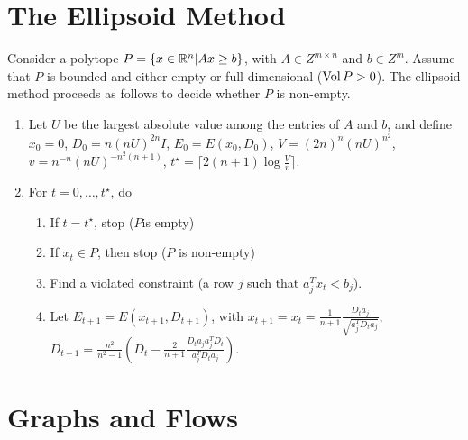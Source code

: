 \section{The Ellipsoid Method}
\label{sec:ellipsoid-method}

\begin{defn}
  \label{sec:ellipsoid-method-1}
  Consider a polytope $P = \{ x \in \mathbb{R}^{n} | Ax \geq b \} $, with $A \in
  Z^{m \times n}$ and $b \in Z^{m}$.  Assume that $P$ is bounded and
  either empty or full-dimensional ($\operatorname*{Vol} P > 0$).  The ellipsoid
  method proceeds as follows to decide whether $P$ is non-empty.

  \begin{enumerate}
  \item Let $U$ be the largest absolute value among the entries of $A$
    and $b$, and define $x_{0} = 0$, $D_{0} = n(nU)^{2n}I$, $E_{0} =
    E(x_{0}, D_{0})$, $V = (2n)^{n}(nU)^{n^{2}}$, $v =
    n^{-n}(nU)^{-n^{2}(n+1)}$, $t^{\star} = \lceil 2(n+1) \log
    \frac{V}{v} \rceil$.
  \item For $t = 0, \dots, t^{\star}$, do
    \begin{enumerate}
    \item If $t = t^{\star}$, stop ($P$is empty)
    \item If $x_{t} \in P$, then stop ($P$ is non-empty)
    \item Find a violated constraint (a row $j$ such that $a_{j}^{T}
      x_{t} < b_{j}$).
    \item Let $E_{t+1} = E(x_{t+1}, D_{t+1})$, with $x_{t+1} = x_{t} =
      \frac{1}{n+1} \frac{D_{t} a_{j}}{\sqrt{a_{j}^{T} D_{t} a_{j}}}$,
      $D_{t+1} = \frac{n^{2}}{n^{2} - 1}(D_{t} - \frac{2}{n+1}
      \frac{D_{t} a_{j} a_{j}^{T} D_{t}}{a_{j}^{T} D_{t} a_{j}})$.
    \end{enumerate}
  \end{enumerate}
\end{defn}


\section{Graphs and Flows}
\label{sec:graphs-flows}

